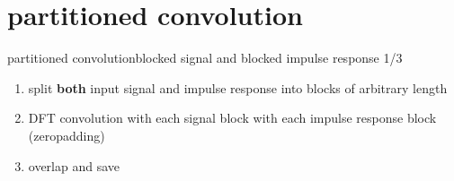 \section[partitioned]{partitioned convolution}
	\begin{frame}{partitioned convolution}{blocked signal and blocked impulse response 1/3}
		\begin{enumerate}
			\item	split \textbf{both} input signal and impulse response into blocks of arbitrary length
			\item	DFT convolution with each signal block with each impulse response block (zeropadding)
			\item	overlap and save
		\end{enumerate}
		\vspace{50mm}
	\end{frame}

